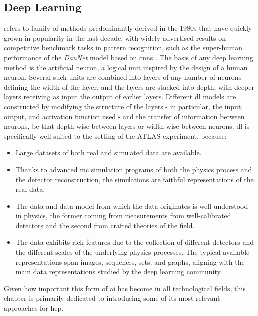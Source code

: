 \subsection{Deep Learning} 
 refers to family of methods predominantly derived in the 1980s that have quickly grown in popularity in the last decade, with widely advertised results on competitive benchmark tasks in pattern recognition, such as the super-human performance of the \textit{DanNet} model \cite{DanNet} based on \glspl{cnn} \cite{NIPS198953c3bce6}. The basis of any deep learning method is the artificial neuron, a logical unit inspired by the design of a human neuron. Several such units are combined into layers of any number of neurons defining the width of the layer, and the layers are stacked into depth, with deeper layers receiving as input the output of earlier layers. Different \gls{dl} models are constructed by modifying the structure of the layers - in particular, the input, output, and activation function used - and the transfer of information between neurons, be that depth-wise between layers or width-wise between neurons. \gls{dl} is specifically well-suited to the setting of the ATLAS experiment, because:
\begin{itemize}
    \item Large datasets of both real and simulated data are available.
    \item Thanks to advanced \gls{mc} simulation programs of both the physics process and the detector reconstruction, the simulations are faithful representations of the real data.
    \item The data and data model from which the data originates is well understood in physics, the former coming from measurements from well-calibrated detectors and the second from crafted theories of the field. 
    \item The data exhibits rich features due to the collection of different detectors and the different scales of the underlying physics processes. The typical available representations span images, sequences, sets, and graphs, aligning with the main data representations studied by the deep learning community.
\end{itemize}
Given how important this form of \gls{ai} has become in all technological fields, this chapter is primarily dedicated to introducing some of its most relevant approaches for \gls{hep}. 

